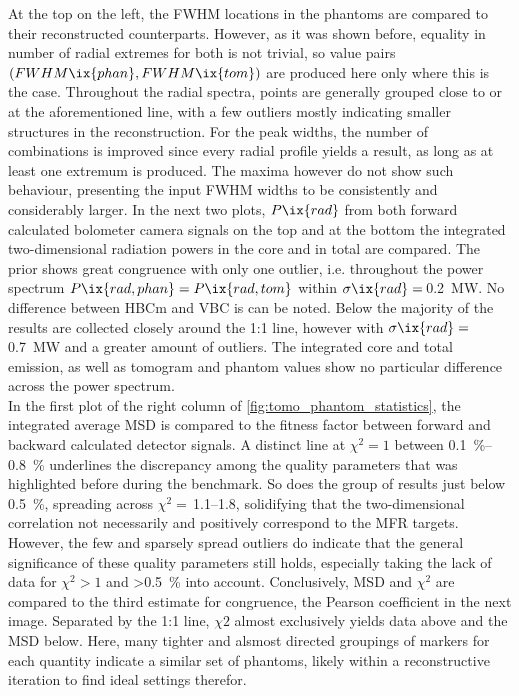             At the top on the left, the FWHM locations in the phantoms are compared to their reconstructed counterparts. However, as it was shown before, equality in number of radial extremes for both is not trivial, so value pairs $\left(FWHM\ix{phan}, FWHM\ix{tom}\right)$ are produced here only where this is the case. Throughout the radial spectra, points are generally grouped close to or at the aforementioned line, with a few outliers mostly indicating smaller structures in the reconstruction. For the peak widths, the number of combinations is improved since every radial profile yields a result, as long as at least one extremum is produced. The maxima however do not show such behaviour, presenting the input FWHM widths to be consistently and considerably larger. In the next two plots, $P\ix{rad}$ from both forward calculated bolometer camera signals on the top and at the bottom the integrated two-dimensional radiation powers in the core and in total are compared. The prior shows great congruence with only one outlier, i.e. throughout the power spectrum $P\ix{rad,phan}=P\ix{rad,tom}$ within $\sigma\ix{rad}=$\,\SI{0.2}{\mega\watt}. No difference between HBCm and VBC is can be noted. Below the majority of the results are collected closely around the 1:1 line, however with $\sigma\ix{rad}=$\,\SI{0.7}{\mega\watt} and a greater amount of outliers. The integrated core and total emission, as well as tomogram and phantom values show no particular difference across the power spectrum.\\%
            In the first plot of the right column of \cref{fig:tomo_phantom_statistics}, the integrated average MSD is compared to the fitness factor between forward and backward calculated detector signals. A distinct line at $\chi^{2}=1$ between \SIrange{0.1}{0.8}{\percent} underlines the discrepancy among the quality parameters that was highlighted before during the benchmark. So does the group of results just below \SI{0.5}{\percent}, spreading across $\chi^{2}=$\,\SIrange{1.1}{1.8}{\arbitraryunit}, solidifying that the two-dimensional correlation not necessarily and positively correspond to the MFR targets. However, the few and sparsely spread outliers do indicate that the general significance of these quality parameters still holds, especially taking the lack of data for $\chi^{2}>1$ and >\SI{0.5}{\percent} into account. Conclusively, MSD and $\chi^{2}$ are compared to the third estimate for congruence, the Pearson coefficient in the next image. Separated by the 1:1 line, $\chi{2}$ almost exclusively yields data above and the MSD below. Here, many tighter and alsmost directed groupings of markers for each quantity indicate a similar set of phantoms, likely within a reconstructive iteration to find ideal settings therefor.\\%
